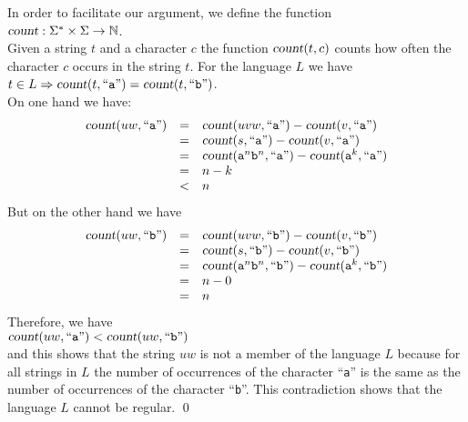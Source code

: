 In order to facilitate our argument, we define the function
\\[0.2cm]
\hspace*{1.3cm}
$\textsl{count}: \Sigma^* \times \Sigma \rightarrow \mathbb{N}$.
\\[0.2cm]
Given a  string $t$ and a character $c$ the function $\textsl{count}(t,c)$ counts how often the
character $c$ occurs in the string $t$.  For the language  $L$ we have
\\[0.2cm]
\hspace*{1.3cm}
$t \in L \Rightarrow \textsl{count}(t,\mbox{``\texttt{a}''}) = \textsl{count}(t, \mbox{``\texttt{b}''})$. 
\\[0.2cm]
On one hand we have:
\[  
\begin{array}{lcl}
\textsl{count}(uw,\mbox{``\texttt{a}''}) & = & \textsl{count}(uvw,\mbox{``\texttt{a}''}) - \textsl{count}(v,\mbox{``\texttt{a}''}) \\
 & = & \textsl{count}(s,\mbox{``\texttt{a}''}) - \textsl{count}(v,\mbox{``\texttt{a}''}) \\
 & = & \textsl{count}(\mathtt{a}^n\mathtt{b}^n,\mbox{``\texttt{a}''}) - \textsl{count}(\mathtt{a}^k,\mbox{``\texttt{a}''}) \\
 & = & n - k  \\
 & < & n   \\
\end{array}
\]
But on the other hand we have
\[  
\begin{array}{lcl}
\textsl{count}(uw,\mbox{``\texttt{b}''}) & = & \textsl{count}(uvw,\mbox{``\texttt{b}''}) - \textsl{count}(v,\mbox{``\texttt{b}''}) \\
                               & = & \textsl{count}(s,\mbox{``\texttt{b}''}) - \textsl{count}(v,\mbox{``\texttt{b}''}) \\
 & = & \textsl{count}(\mathtt{a}^n\mathtt{b}^n,\mbox{``\texttt{b}''}) - \textsl{count}(\mathtt{a}^k,\mbox{``\texttt{b}''}) \\
                               & = & n  - 0\\
                               & = & n  
\end{array}
\]
Therefore, we have
\\[0.2cm]
\hspace*{1.3cm}
$\textsl{count}(uw,\mbox{``\texttt{a}''}) < \textsl{count}(uw,\mbox{``\texttt{b}''})$
\\[0.2cm]
and this shows that the string $uw$ is not a member of the language $L$ because for all strings in $L$ 
the number of occurrences of the character ``\texttt{a}'' is the same as the number of
occurrences of the character ``\texttt{b}''.  This contradiction shows that the language $L$ cannot
be regular.
\qed

